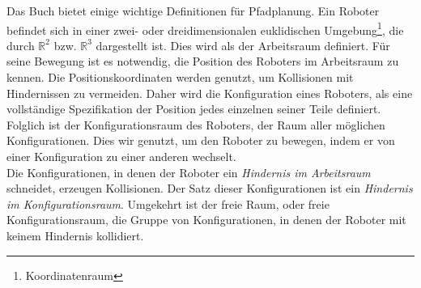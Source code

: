 %
%
%
Das Buch \cite{Principles:05} bietet einige wichtige Definitionen für Pfadplanung. Ein Roboter befindet sich in einer zwei- oder dreidimensionalen euklidischen Umgebung\footnote{Koordinatenraum}, die durch $\mathbb{R}^{2}$ bzw. $\mathbb{R}^{3}$ dargestellt ist. Dies wird als der Arbeitsraum definiert. Für seine Bewegung ist es notwendig, die Position des Roboters im Arbeitsraum zu kennen. Die Positionskoordinaten werden genutzt, um Kollisionen mit Hindernissen zu vermeiden. Daher wird die Konfiguration eines Roboters, als eine vollständige Spezifikation der Position jedes einzelnen seiner Teile definiert. Folglich ist der Konfigurationsraum des Roboters, der Raum aller möglichen Konfigurationen. Dies wir genutzt, um den Roboter zu bewegen, indem er von einer Konfiguration zu einer anderen wechselt.\\
Die Konfigurationen, in denen der Roboter ein \textit{Hindernis im Arbeitsraum} schneidet, erzeugen Kollisionen. Der Satz dieser Konfigurationen ist ein \textit{Hindernis im Konfigurationsraum}. 
Umgekehrt ist der freie Raum, oder freie Konfigurationsraum, die Gruppe von Konfigurationen, in denen der Roboter mit keinem Hindernis kollidiert.


